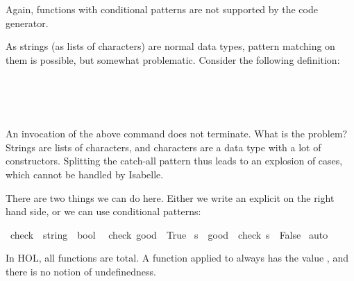 \begin{isabellebody}
\begin{isamarkuptext}
  Again, functions with conditional patterns are not supported by the
  code generator.%
\end{isamarkuptext}%
\isamarkuptrue%
%
\isamarkuptrue%
%
\begin{isamarkuptext}%
As strings (as lists of characters) are normal data types, pattern
  matching on them is possible, but somewhat problematic. Consider the
  following definition:

\end{isamarkuptext}
\noindent{} \\%
\\%
\hspace*{2ex}\\%
\begin{isamarkuptext}

  An invocation of the above  command does not
  terminate. What is the problem? Strings are lists of characters, and
  characters are a data type with a lot of constructors. Splitting the
  catch-all pattern thus leads to an explosion of cases, which cannot
  be handled by Isabelle.

  There are two things we can do here. Either we write an explicit
   on the right hand side, or we can use conditional patterns:%
\end{isamarkuptext}%
\isamarkuptrue%
\isamarkupfalse%
\ check\ {\isacharcolon}{\isacharcolon}\ {\isachardoublequoteopen}string\ {\isasymRightarrow}\ bool{\isachardoublequoteclose}\isanewline
{}\isanewline
\ \ {\isachardoublequoteopen}check\ {\isacharparenleft}{\isacharprime}{\isacharprime}good{\isacharprime}{\isacharprime}{\isacharparenright}\ {\isacharequal}\ True{\isachardoublequoteclose}\isanewline
{\isacharbar}\ {\isachardoublequoteopen}s\ {\isasymnoteq}\ {\isacharprime}{\isacharprime}good{\isacharprime}{\isacharprime}\ {\isasymLongrightarrow}\ check\ s\ {\isacharequal}\ False{\isachardoublequoteclose}\isanewline
%
\isadelimproof
%
\endisadelimproof
%
\isatagproof
{}\isamarkupfalse%
\ auto%
\endisatagproof
{\isafoldproof}%
%
\isadelimproof
%
\endisadelimproof
%
\isamarkuptrue%
%
\begin{isamarkuptext}%
In HOL, all functions are total. A function  applied to
   always has the value , and there is no notion
  of undefinedness. 
  

\end{isamarkuptext}
\end{isabellebody}
